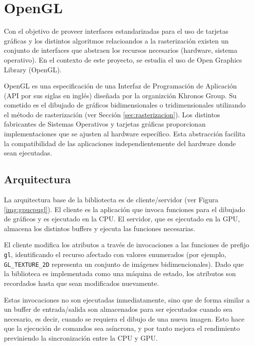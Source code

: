 \section{OpenGL}

Con el objetivo de proveer interfaces estandarizadas para el uso de tarjetas gráficas y los distintos algoritmos relacioandos a la rasterización existen un conjunto de interfaces que abstraen los recursos necesarios (hardware, sistema operativo). En el contexto de este proyecto, se estudia el uso de Open Graphics Library (OpenGL).

OpenGL es una especificación de una Interfaz de Programación de Aplicación (API por sus siglas en inglés) diseñada por la organizción Khronos Group. Su cometido es el dibujado de gráficos bidimensionales o tridimensionales utilizando el método de rasterización (ver Sección \ref{sec:rasterizacion}). Los distintos fabricantes de Sistemas Operativos y tarjetas gráficas proporcionan implementaciones que se ajusten al hardware específico. Esta abstracción facilita la compatibilidad de las aplicaciones independientemente del hardware donde sean ejecutadas.

\subsection{Arquitectura}
La arquitectura base de la bibliotecta es de cliente/servidor (ver Figura \ref{img:gpucpugl}). El cliente es la aplicación que invoca funciones para el dibujado de gráficos y es ejecutado en la CPU. El servidor, que es ejecutado en la GPU, almacena los distintos buffers y ejecuta las funciones necesarias.

El cliente modifica los atributos a través de invocaciones a las funciones de prefijo \verb|gl|, identificando el recurso afectado con valores enumerados (por ejemplo, \verb|GL_TEXTURE_2D| representa un conjunto de imágenes bidimencionales). Dado que la biblioteca es implementada como una máquina de estado, los atributos son recordados hasta que sean modificados nuevamente.

Estas invocaciones no son ejecutadas inmediatamente, sino que de forma similar a un buffer de entrada/salida son almacenados para ser ejecutados cuando sea necesario, es decir, cuando se requiera el dibujo de una nueva imagen. Esto hace que la ejecución de comandos sea asíncrona, y por tanto mejora el rendimiento previniendo la sincronización entre la CPU y GPU.

